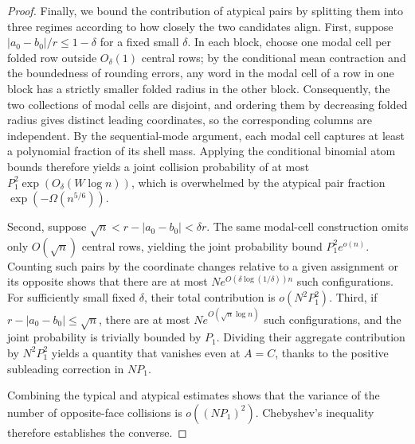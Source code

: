 \begin{proof}
Finally, we bound the contribution of atypical pairs by splitting them into three regimes according to how closely the two candidates align. First, suppose \(|a_0-b_0|/r\le1-\delta\) for a fixed small \(\delta\). In each block, choose one modal cell per folded row outside \(O_\delta(1)\) central rows; by the conditional mean contraction and the boundedness of rounding errors, any word in the modal cell of a row in one block has a strictly smaller folded radius in the other block. Consequently, the two collections of modal cells are disjoint, and ordering them by decreasing folded radius gives distinct leading coordinates, so the corresponding columns are independent. By the sequential-mode argument, each modal cell captures at least a polynomial fraction of its shell mass. Applying the conditional binomial atom bounds therefore yields a joint collision probability of at most \(P_1^2\exp(O_\delta(W\log n))\), which is overwhelmed by the atypical pair fraction \(\exp(-\Omega(n^{5/6}))\).

Second, suppose \(\sqrt n<r-|a_0-b_0|<\delta r\). The same modal-cell construction omits only \(O(\sqrt n)\) central rows, yielding the joint probability bound \(P_1^2e^{o(n)}\). Counting such pairs by the coordinate changes relative to a given assignment or its opposite shows that there are at most \(N e^{O(\delta\log(1/\delta))n}\) such configurations. For sufficiently small fixed \(\delta\), their total contribution is \(o(N^2P_1^2)\). Third, if \(r-|a_0-b_0|\le\sqrt n\), there are at most \(N e^{O(\sqrt n\log n)}\) such configurations, and the joint probability is trivially bounded by \(P_1\). Dividing their aggregate contribution by \(N^2P_1^2\) yields a quantity that vanishes even at \(A=C\), thanks to the positive subleading correction in \(NP_1\).

Combining the typical and atypical estimates shows that the variance of the number of opposite-face collisions is \(o((NP_1)^2)\). Chebyshev's inequality therefore establishes the converse.
\end{proof}
